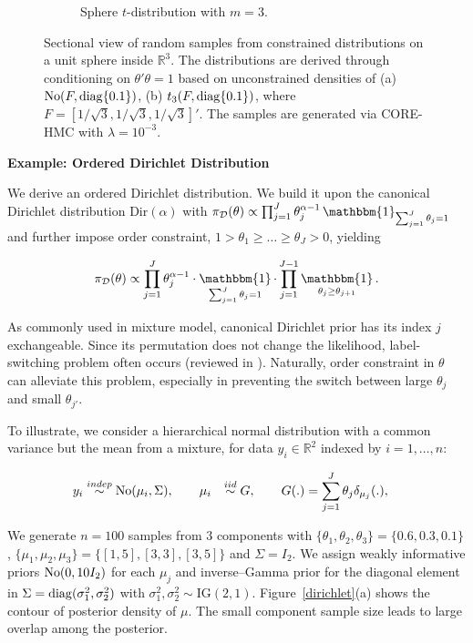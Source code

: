\documentclass[10pt,fleqn]{article} \pdfoutput=1
\newcommand{\bb}[1]{\mathbb{#1}} \newcommand{\mc}[1]{\mathcal{#1}}
\DeclareMathOperator{\1}{\mathbbm{1}} \DeclareMathOperator{\bigO}{\mc O}
\begin{document}
\begin{figure}[H]
\begin{subfigure}[b]{0.45\textwidth}
\caption{Sphere $t$-distribution with $m=3$.}
\end{subfigure}
\caption{Sectional view of random samples from constrained distributions on a unit sphere inside $\bb R^3$. The distributions are derived through conditioning on $\theta'\theta=1$ based on unconstrained densities of (a) $\operatorname{No}( F, \operatorname{diag}\{0.1\})$, (b) $t_3(F,\operatorname{diag}\{0.1\} )$, where $F=[1/\sqrt{3},1/\sqrt{3},1/\sqrt{3}]'$. The samples are generated via CORE-HMC with $\lambda=10^{-3}$.
}
\label{sphere_examples}
\end{figure}

\textbf{Example: Ordered Dirichlet Distribution}

We derive an ordered Dirichlet distribution. We build it upon the canonical Dirichlet distribution $\mbox{Dir}(\alpha)$ with $
\pi_{\mc D}(\theta) \propto \prod_{j=1}^J \theta_j^{\alpha-1} \1_{\sum_{j=1}^J \theta_j=1}$ and further impose order constraint, $1> \theta_1 \ge \ldots \ge \theta_J > 0$, yielding


 \begin{equation}
\begin{aligned}
\label{ordered_dp_prior}
\pi_{\mc D}(\theta) \propto \prod_{j=1}^J \theta_j^{\alpha-1} \cdot \1_{\sum_{j=1}^J \theta_j=1} \cdot  \prod_{j=1}^{J-1}\1_{\theta_j \ge \theta_{j+1}}.
\end{aligned}
\end{equation}

As commonly used in mixture model, canonical Dirichlet prior has its index $j$ exchangeable. Since its permutation does not change the likelihood, label-switching problem often occurs (reviewed in \cite{jasra2005markov}). Naturally, order constraint in $\theta$ can alleviate this problem, especially in preventing the switch between large $\theta_j$ and small $\theta_{j'}$.

To illustrate, we consider a hierarchical normal distribution with a common variance but the mean from a mixture, for data $y_i\in \bb R^2$ indexed by $i=1,\ldots,n$:

\begin{equation*}
\begin{aligned}
y_i &\stackrel{indep}{\sim} \operatorname{No}(\mu_i,\Sigma),\qquad
\mu_i &\stackrel{iid}{\sim} G,\qquad
G(.) & = \sum_{j=1}^{J} \theta_j \delta_{\mu_j}(.),
\end{aligned}
\end{equation*}

We generate $n=100$ samples from $3$ components with $\{\theta_1,\theta_2,\theta_3\}=\{0.6,0.3,0.1\}$, $\{\mu_1,\mu_2,\mu_3\} = \{[1,5], [3,3], [3,5]\}$ and $\Sigma = I_2$. We assign weakly informative priors $\operatorname{No}(0,10 I_2)$ for each $\mu_j$ and inverse--Gamma prior for the diagonal element in $\Sigma=\operatorname{diag}(\sigma_1^2,\sigma_2^2)$ with $\sigma^2_1, \sigma^2_2\sim \mbox{IG}(2,1)$.  Figure~\ref{dirichlet}(a) shows the contour of posterior density of $\mu$. The small component sample size leads to large overlap among the posterior. 
\end{document}
